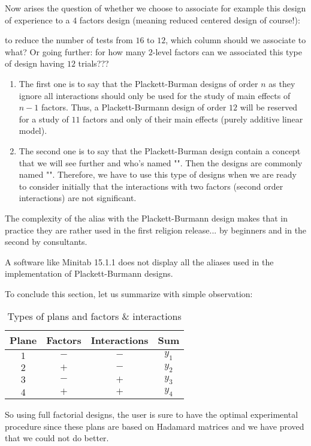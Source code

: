 	Now arises the question of whether we choose to associate for example this design of experience to a $4$ factors design (meaning reduced centered design of course!):
	
	to reduce the number of tests from $16$ to $12$, which column should we associate to what? Or going further: for how many $2$-level factors can we associated this type of design having $12$ trials???
	\begin{enumerate}
		\item The first one is to say that the Plackett-Burman designs of order $n$ as they ignore all interactions should only be used for the study of main effects of $n-1$ factors. Thus, a Plackett-Burmann design of order $12$ will be reserved for a study of $11$ factors and only of their main effects (purely additive linear model).

		\item The second one is to say that the Plackett-Burman design contain a concept that we will see further and who's named "". Then the designs are commonly named "". Therefore, we have to use this type of designs when we are ready to consider initially that the interactions with two factors (second order interactions) are not significant.
	\end{enumerate}
	The complexity of the alias with the Plackett-Burmann design makes that in practice they are rather used in the first religion release... by beginners and in the second by consultants.
	\begin{tcolorbox}[title=Remark,colframe=black,arc=10pt]
	A software like Minitab 15.1.1 does not display all the aliases used in the implementation of Plackett-Burmann designs.
	\end{tcolorbox}
	To conclude this section, let us summarize with simple observation:
	\begin{table}[H]\centering
	\begin{center}
			\begin{tabular}{|c|c|c|c|}
				\hline
				\multicolumn{1}{c}{\cellcolor{black!30}\textbf{Plane}} & 
  \multicolumn{1}{c}{\cellcolor{black!30}\textbf{Factors}} & 
  \multicolumn{1}{c}{\cellcolor{black!30}\textbf{Interactions}} & 
  \multicolumn{1}{c}{\cellcolor{black!30}\textbf{Sum}} \\ \hline
				 $1$ &  $-$ & $-$ &  $y_1$\\ \hline
				 $2$ &  $+$ & $-$ &  $y_2$\\ \hline
				 $3$ &  $-$ & $+$ &  $y_3$\\ \hline
				 $4$ &  $+$ & $+$ &  $y_4$\\ \hline
		\end{tabular}
	\end{center}
	\caption{Types of plans and factors \& interactions}
	\end{table}
	So using full factorial designs, the user is sure to have the optimal experimental procedure since these plans are based on Hadamard matrices and we have proved that we could not do better.
	

